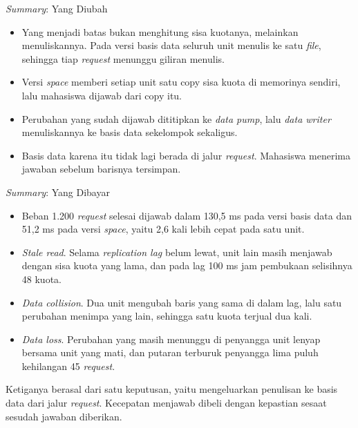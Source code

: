 \documentclass[aspectratio=169, table, 12pt]{beamer}
\begin{document}
\begin{frame}{{\Large \textit{Summary}: Yang Diubah}}
  \vspace{10pt}
  \begin{itemize}\small
    \item Yang menjadi batas bukan menghitung sisa kuotanya, melainkan
          menuliskannya. Pada versi basis data seluruh unit menulis ke satu
          \textit{file}, sehingga tiap \textit{request} menunggu giliran menulis.
    \item Versi \textit{space} memberi setiap unit satu copy sisa kuota di
          memorinya sendiri, lalu mahasiswa dijawab dari copy itu.
    \item Perubahan yang sudah dijawab dititipkan ke \textit{data pump}, lalu
          \textit{data writer} menuliskannya ke basis data sekelompok
          sekaligus.
    \item Basis data karena itu tidak lagi berada di jalur \textit{request}.
          Mahasiswa menerima jawaban sebelum barisnya tersimpan.
  \end{itemize}
\end{frame}

\begin{frame}{{\Large \textit{Summary}: Yang Dibayar}}
  \vspace{10pt}
  \begin{itemize}\small
    \item Beban 1.200 \textit{request} selesai dijawab dalam 130,5 ms pada
          versi basis data dan 51,2 ms pada versi \textit{space}, yaitu 2,6
          kali lebih cepat pada satu unit.
    \item \textit{Stale read}. Selama \textit{replication lag} belum lewat,
          unit lain masih menjawab dengan sisa kuota yang lama, dan pada lag
          100 ms jam pembukaan selisihnya 48 kuota.
    \item \textit{Data collision}. Dua unit mengubah baris yang sama di dalam
          lag, lalu satu perubahan menimpa yang lain, sehingga satu kuota
          terjual dua kali.
    \item \textit{Data loss}. Perubahan yang masih menunggu di penyangga unit
          lenyap bersama unit yang mati, dan putaran terburuk penyangga lima
          puluh kehilangan 45 \textit{request}.
  \end{itemize}

  \vspace{4pt}
  {\small Ketiganya berasal dari satu keputusan, yaitu mengeluarkan penulisan
  ke basis data dari jalur \textit{request}. Kecepatan menjawab dibeli dengan
  kepastian sesaat sesudah jawaban diberikan.}
\end{frame}
\end{document}
